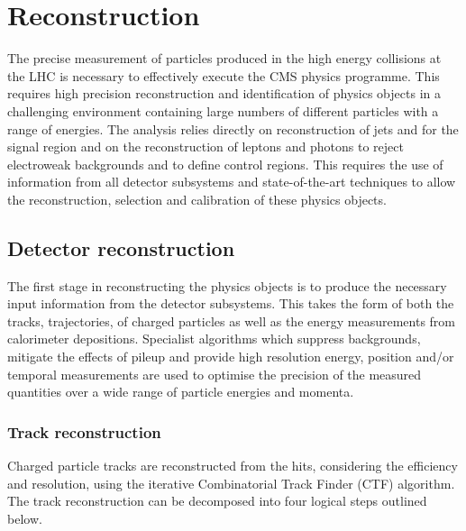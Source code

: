 \chapter{Reconstruction} %

The precise measurement of particles produced in the high energy collisions at the LHC 
is necessary to effectively execute the CMS physics programme. This requires high precision
reconstruction and identification of physics objects in a challenging environment containing
large numbers of different particles with a range of energies. The \alphat analysis 
relies directly on reconstruction of jets and \met for the signal region and on the 
reconstruction of leptons and photons to reject electroweak 
backgrounds and to define control regions.
This requires the use of information from all detector subsystems and state-of-the-art
techniques to allow the reconstruction, selection and calibration of these physics objects.


\section{Detector reconstruction}

The first stage in reconstructing the physics objects is to produce the necessary
input information from the detector subsystems. This takes the form of both the tracks, 
trajectories, of charged particles as well as the energy measurements from
calorimeter depositions. Specialist algorithms which suppress backgrounds, 
mitigate the effects of pileup and provide high resolution energy,
position and/or temporal measurements are used to optimise the precision of the 
measured quantities over a wide range of particle energies and momenta.

\subsection{Track reconstruction}

Charged particle tracks are reconstructed from the hits, considering the efficiency and resolution, 
using the iterative Combinatorial Track Finder (CTF) algorithm. The track reconstruction can be decomposed 
into four logical steps outlined below.

